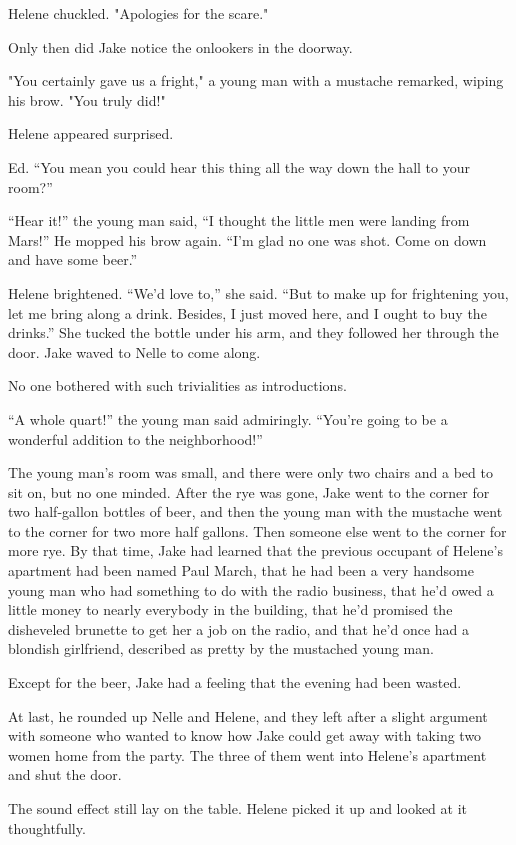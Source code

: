 \documentclass{novel}
\begin{document}
Helene chuckled. "Apologies for the scare."

Only then did Jake notice the onlookers in the doorway.

"You certainly gave us a fright," a young man with a mustache remarked, wiping his brow. "You truly did!"

Helene appeared surprised.

Ed. “You mean you could hear this thing all the way down the hall to your room?”

“Hear it!” the young man said, “I thought the little men were landing from Mars!” He mopped his brow again. “I’m glad no one was shot. Come on down and have some beer.”

Helene brightened. “We’d love to,” she said. “But to make up for frightening you, let me bring along a drink. Besides, I just moved here, and I ought to buy the drinks.” She tucked the bottle under his arm, and they followed her through the door. Jake waved to Nelle to come along.

No one bothered with such trivialities as introductions.

“A whole quart!” the young man said admiringly. “You’re going to be a wonderful addition to the neighborhood!”

The young man’s room was small, and there were only two chairs and a bed to sit on, but no one minded. After the rye was gone, Jake went to the corner for two half-gallon bottles of beer, and then the young man with the mustache went to the corner for two more half gallons. Then someone else went to the corner for more rye. By that time, Jake had learned that the previous occupant of Helene’s apartment had been named Paul March, that he had been a very handsome young man who had something to do with the radio business, that he’d owed a little money to nearly everybody in the building, that he’d promised the disheveled brunette to get her a job on the radio, and that he’d once had a blondish girlfriend, described as pretty by the mustached young man.

Except for the beer, Jake had a feeling that the evening had been wasted.

At last, he rounded up Nelle and Helene, and they left after a slight argument with someone who wanted to know how Jake could get away with taking two women home from the party. The three of them went into Helene’s apartment and shut the door.

The sound effect still lay on the table. Helene picked it up and looked at it thoughtfully.
\end{document}
